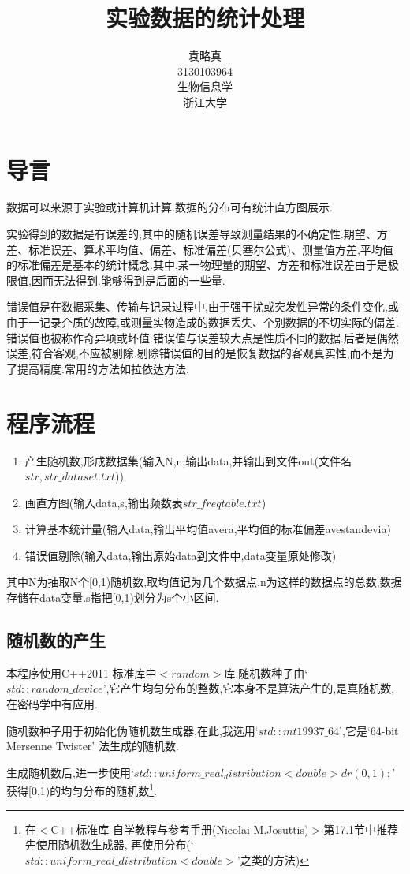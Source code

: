 \documentclass[10pt,a4paper]{article}
\title{实验数据的统计处理}
\author{袁略真\\3130103964\\生物信息学\\浙江大学}
\begin{document}
\maketitle
\section{导言}
数据可以来源于实验或计算机计算.数据的分布可有统计直方图展示.

实验得到的数据是有误差的,其中的随机误差导致测量结果的不确定性.期望、方差、标准误差、算术平均值、偏差、标准偏差(贝塞尔公式)、测量值方差,平均值的标准偏差是基本的统计概念.其中,某一物理量的期望、方差和标准误差由于是极限值,因而无法得到.能够得到是后面的一些量.

错误值是在数据采集、传输与记录过程中,由于强干扰或突发性异常的条件变化,或由于一记录介质的故障,或测量实物造成的数据丢失、个别数据的不切实际的偏差.错误值也被称作奇异项或坏值.错误值与误差较大点是性质不同的数据.后者是偶然误差,符合客观,不应被剔除.剔除错误值的目的是恢复数据的客观真实性,而不是为了提高精度.常用的方法如拉依达方法.
\section{程序流程}
\begin{enumerate}
\item 产生随机数,形成数据集(输入N,n,输出data,并输出到文件out(文件名$str,str\_dataset.txt$))
\item 画直方图(输入data,s,输出频数表$str\_freqtable.txt$)
\item 计算基本统计量(输入data,输出平均值avera,平均值的标准偏差avestandevia)
\item 错误值剔除(输入data,输出原始data到文件中,data变量原处修改)
\end{enumerate}
其中N为抽取N个[0,1)随机数,取均值记为几个数据点.n为这样的数据点的总数,数据存储在data变量.s指把[0,1)划分为s个小区间.

\subsection{随机数的产生}
本程序使用C++2011 标准库中$<random>$库.随机数种子由`$std::random\_device$',它产生均匀分布的整数,它本身不是算法产生的,是真随机数,在密码学中有应用.

随机数种子用于初始化伪随机数生成器,在此,我选用`$std::mt19937\_64$',它是`64-bit Mersenne Twister' 法生成的随机数.

生成随机数后,进一步使用`$std::uniform\_real_distribution<double> dr(0,1);$' 获得[0,1)的均匀分布的随机数\footnote{在$<$C++标准库-自学教程与参考手册(Nicolai M.Josuttis)$>$第17.1节中推荐先使用随机数生成器, 再使用分布(`$std::uniform\_real\_distribution<double>$'之类的方法)}.
\end{document}
